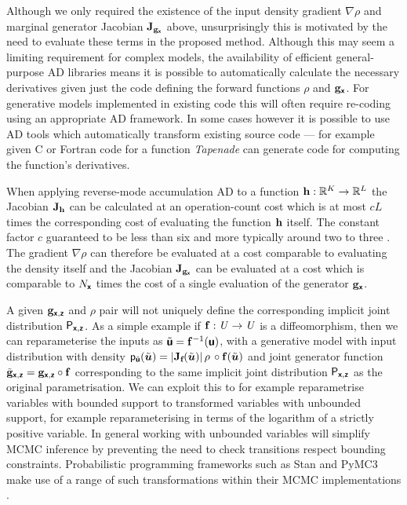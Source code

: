 Although we only required the existence of the input density gradient $\nabla\rho$ and marginal generator Jacobian $\mathbf{J}_{{\mathbf{g}}_{\boldsymbol{\mathsf{x}}}}$ above, unsurprisingly this is motivated by the need to evaluate these terms in the proposed method. Although this may seem a limiting requirement for complex models, the availability of efficient general-purpose \ac{AD} libraries \citep{baydin2015automatic} means it is possible to automatically calculate the necessary derivatives given just the code defining the forward functions $\rho$ and ${\mathbf{g}}_{\boldsymbol{\mathsf{x}}}$. For generative models implemented in existing code this will often require re-coding using an appropriate \ac{AD} framework. In some cases however it is possible to use \ac{AD} tools which automatically transform existing source code --- for example given C or Fortran code for a function \emph{Tapenade} \citep{hascoet2013tapenade} can generate code for computing the function's derivatives.

When applying reverse-mode accumulation \ac{AD} to a function ${\mathbf{h}} : \mathbb{R}^K \to \mathbb{R}^L$ the Jacobian $\mathbf{J}_{{\mathbf{h}}}$ can be calculated at an operation-count cost which is at most $c L$ times the corresponding cost of evaluating the function ${\mathbf{h}}$ itself. The constant factor $c$ guaranteed to be less than six and more typically around two to three \citep{baydin2015automatic}. The gradient $\nabla\rho$  can therefore be evaluated at a cost comparable to evaluating the density itself and the Jacobian $\mathbf{J}_{{\mathbf{g}}_{\boldsymbol{\mathsf{x}}}}$ can be evaluated at a cost which is comparable to $N_{\boldsymbol{\mathsf{x}}}$ times the cost of a single evaluation of the generator ${\mathbf{g}}_{\boldsymbol{\mathsf{x}}}$.

A given ${\mathbf{g}}_{\boldsymbol{\mathsf{x}},\boldsymbol{\mathsf{z}}}$ and $\rho$ pair will not uniquely define the corresponding implicit joint distribution $\mathsf{P}_{\boldsymbol{\mathsf{x}},\boldsymbol{\mathsf{z}}}$. As a simple example if ${\mathbf{f}} : \mathit{U} \to \mathit{U}$ is a diffeomorphism, then we can reparameterise the inputs as $\tilde{\boldsymbol{\mathsf{u}}} = {\mathbf{f}}^{-1}(\boldsymbol{\mathsf{u}})$, with a generative model with input distribution with density $\pden{\tilde{\rvct{u}}}(\tilde{\vct{u}}) = \left|\jacob{\vctfunc{f}}{\tilde{\vct{u}}}\right|\, \rho \,\circ \vctfunc{f}(\tilde{\vct{u}})$ and joint generator function $\tilde{{\mathbf{g}}}_{\boldsymbol{\mathsf{x}},\boldsymbol{\mathsf{z}}} = {{\mathbf{g}}}_{\boldsymbol{\mathsf{x}},\boldsymbol{\mathsf{z}}} \circ {\mathbf{f}}$ corresponding to the same implicit joint distribution $\mathsf{P}_{\boldsymbol{\mathsf{x}},\boldsymbol{\mathsf{z}}}$ as the original parametrisation. We can exploit this to for example reparametrise variables with bounded support to transformed variables with unbounded support, for example reparameterising in terms of the logarithm of a strictly positive variable. In general working with unbounded variables will simplify \ac{MCMC} inference by preventing the need to check transitions respect bounding constraints. Probabilistic programming frameworks such as Stan \citep{gelman2015stan} and PyMC3 make use of a range of such transformations within their \ac{MCMC} implementations \citep{salvatier2016probabilistic}. %

